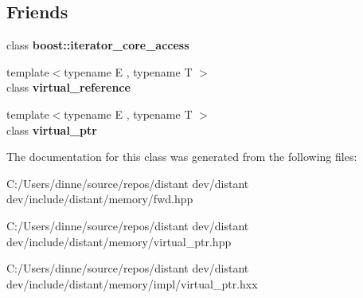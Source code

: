 \subsection*{Friends}
\begin{DoxyCompactItemize}
\item 
\mbox{\label{classdistant_1_1memory_1_1virtual__ptr_ac09f73e325921cc50ebcd96bed0f8096}} 
class {\bfseries boost\+::iterator\+\_\+core\+\_\+access}
\item 
\mbox{\label{classdistant_1_1memory_1_1virtual__ptr_acebd62ead6c46eaab65bf9900edf2492}} 
{\footnotesize template$<$typename E , typename T $>$ }\\class {\bfseries virtual\+\_\+reference}
\item 
\mbox{\label{classdistant_1_1memory_1_1virtual__ptr_abd803c82999262af198dd4b0e0262801}} 
{\footnotesize template$<$typename E , typename T $>$ }\\class {\bfseries virtual\+\_\+ptr}
\end{DoxyCompactItemize}


The documentation for this class was generated from the following files\+:\begin{DoxyCompactItemize}
\item 
C\+:/\+Users/dinne/source/repos/distant dev/distant dev/include/distant/memory/fwd.\+hpp\item 
C\+:/\+Users/dinne/source/repos/distant dev/distant dev/include/distant/memory/virtual\+\_\+ptr.\+hpp\item 
C\+:/\+Users/dinne/source/repos/distant dev/distant dev/include/distant/memory/impl/virtual\+\_\+ptr.\+hxx\end{DoxyCompactItemize}

